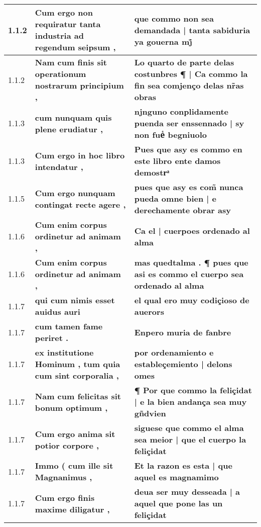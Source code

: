 \begin{tabular}{|p{1cm}|p{6.5cm}|p{6.5cm}|}

\hline
1.1.2 &  \textbf{ Cum ergo non requiratur tanta industria ad regendum seipsum , }  &  \textbf{ que commo non sea demandada | tanta sabiduria ya gouerna mj̊ }  \\\hline
1.1.2 &  \textbf{ Nam cum finis sit operationum nostrarum principium , }  &  \textbf{ Lo quarto de parte delas costunbres ¶ | Ca commo la fin sea comjenço delas nr̃as obras }  \\\hline
1.1.3 &  \textbf{ cum nunquam quis plene erudiatur , }  &  \textbf{ njnguno conplidamente puenda ser enssennado | sy non fueᷤ begniuolo }  \\\hline
1.1.3 &  \textbf{ Cum ergo in hoc libro intendatur , }  &  \textbf{ Pues que asy es commo en este libro ente damos demostrͣ }  \\\hline
1.1.5 &  \textbf{ Cum ergo nunquam contingat recte agere , }  &  \textbf{ pues que asy es com̃ nunca pueda omne bien | e derechamente obrar asy }  \\\hline
1.1.6 &  \textbf{ Cum enim corpus ordinetur ad animam , }  &  \textbf{ Ca el | cuerpoes ordenado al alma }  \\\hline
1.1.6 &  \textbf{ Cum enim corpus ordinetur ad animam , }  &  \textbf{ mas quedtalma . ¶ pues que asi es commo el cuerpo sea ordenado al alma }  \\\hline
1.1.7 &  \textbf{ qui cum nimis esset auidus auri }  &  \textbf{ el qual ero muy codiçioso de auerors }  \\\hline
1.1.7 &  \textbf{ cum tamen fame periret . }  &  \textbf{ Enpero muria de fanbre }  \\\hline
1.1.7 &  \textbf{ ex institutione Hominum , tum quia cum sint corporalia , }  &  \textbf{ por ordenamiento e estableçemiento | delons omes }  \\\hline
1.1.7 &  \textbf{ Nam cum felicitas sit bonum optimum , }  &  \textbf{ ¶ Por que commo la feliçidat | e la bien andança sea muy gñdvien }  \\\hline
1.1.7 &  \textbf{ Cum ergo anima sit potior corpore , }  &  \textbf{ siguese que commo el alma sea meior | que el cuerpo la feliçidat }  \\\hline
1.1.7 &  \textbf{ Immo ( cum ille sit Magnanimus , }  &  \textbf{ Et la razon es esta | que aquel es magnamimo }  \\\hline
1.1.7 &  \textbf{ Cum ergo finis maxime diligatur , }  &  \textbf{ deua ser muy desseada | a aquel que pone las un feliçidat }  \\\hline

\end{tabular}
